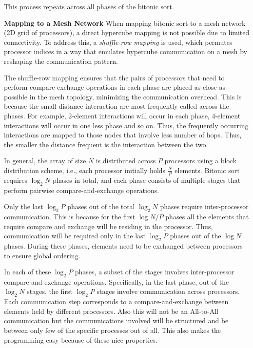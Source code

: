 \documentclass[12pt]{book}
\begin{document}
This process repeats across all phases of the bitonic sort.

\textbf{Mapping to a Mesh Network}
When mapping bitonic sort to a mesh network (2D grid of processors), a direct hypercube mapping is not possible due to limited connectivity. To address this, a \emph{shuffle-row mapping} is used, which permutes processor indices in a way that emulates hypercube communication 
on a mesh by reshaping the communication pattern.

The shuffle-row mapping ensures that the pairs of processors that need to perform compare-exchange operations in each phase are placed as close as possible in the mesh topology, minimizing the communication overhead. This is because the small distance interaction are most frequently called across the phases. For example, 2-element interactions will occur in each phase, 4-element interactions will occur in one less phase and so on. Thus, the frequently occurring interactions are mapped to those nodes that involve less number of hops. Thus, the smaller the distance frequent is the interaction between the two.

In general, the array of size $N$ is distributed across $P$ processors using a block distribution scheme, i.e., each processor initially holds $\frac{N}{P}$ elements. Bitonic sort requires $\log_2 N$ phases in total, and each phase consists of multiple stages that perform pairwise compare-and-exchange operations.

Only the last $\log_2 P$ phases out of the total $\log_2 N$ phases require inter-processor communication. This is because for the first $\log N/P$ phases all the elements that require compare and exchange will be residing in the processor. Thus, communication will be required only in the last $\log_2 P$ phases out of the $\log N$ phases. During these phases, elements need to be exchanged between processors to ensure global ordering. 

In each of these $\log_2 P$ phases, a subset of the stages involves inter-processor compare-and-exchange operations. Specifically, in the last phase, out of the $\log_2 N$ stages, the first $\log_2 P$ stages involve communication across processors. Each communication step corresponds to a compare-and-exchange between elements held by different processors. Also this will not be an All-to-All communication but the communications involved will be structured and be between only few of the specific processes out of all. This also makes the programming easy because of these nice properties.
\end{document}
